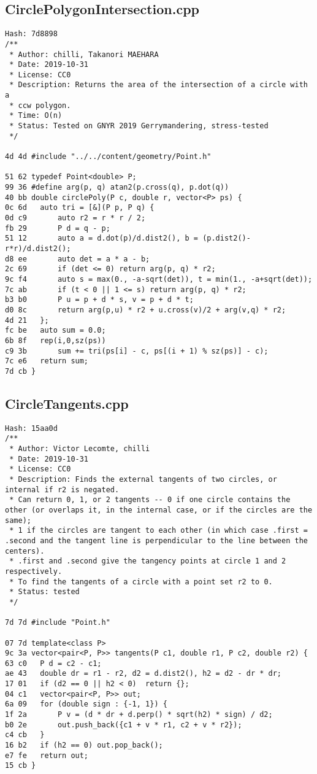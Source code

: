 \documentclass[11pt, a4paper, twoside]{article}
\begin{document}
\subsection{CirclePolygonIntersection.cpp}
\begin{lstlisting}
Hash: 7d8898
/**
 * Author: chilli, Takanori MAEHARA
 * Date: 2019-10-31
 * License: CC0
 * Description: Returns the area of the intersection of a circle with a
 * ccw polygon.
 * Time: O(n)
 * Status: Tested on GNYR 2019 Gerrymandering, stress-tested
 */

4d 4d #include "../../content/geometry/Point.h"

51 62 typedef Point<double> P;
99 36 #define arg(p, q) atan2(p.cross(q), p.dot(q))
40 bb double circlePoly(P c, double r, vector<P> ps) {
0c 6d 	auto tri = [&](P p, P q) {
0d c9 		auto r2 = r * r / 2;
fb 29 		P d = q - p;
51 12 		auto a = d.dot(p)/d.dist2(), b = (p.dist2()-r*r)/d.dist2();
d8 ee 		auto det = a * a - b;
2c 69 		if (det <= 0) return arg(p, q) * r2;
9c f4 		auto s = max(0., -a-sqrt(det)), t = min(1., -a+sqrt(det));
7c ab 		if (t < 0 || 1 <= s) return arg(p, q) * r2;
b3 b0 		P u = p + d * s, v = p + d * t;
d0 8c 		return arg(p,u) * r2 + u.cross(v)/2 + arg(v,q) * r2;
4d 21 	};
fc be 	auto sum = 0.0;
6b 8f 	rep(i,0,sz(ps))
c9 3b 		sum += tri(ps[i] - c, ps[(i + 1) % sz(ps)] - c);
7c e6 	return sum;
7d cb }
\end{lstlisting}

\subsection{CircleTangents.cpp}
\begin{lstlisting}
Hash: 15aa0d
/**
 * Author: Victor Lecomte, chilli
 * Date: 2019-10-31
 * License: CC0
 * Description: Finds the external tangents of two circles, or internal if r2 is negated.
 * Can return 0, 1, or 2 tangents -- 0 if one circle contains the other (or overlaps it, in the internal case, or if the circles are the same);
 * 1 if the circles are tangent to each other (in which case .first = .second and the tangent line is perpendicular to the line between the centers).
 * .first and .second give the tangency points at circle 1 and 2 respectively.
 * To find the tangents of a circle with a point set r2 to 0.
 * Status: tested
 */

7d 7d #include "Point.h"

07 7d template<class P>
9c 3a vector<pair<P, P>> tangents(P c1, double r1, P c2, double r2) {
63 c0 	P d = c2 - c1;
ae 43 	double dr = r1 - r2, d2 = d.dist2(), h2 = d2 - dr * dr;
17 01 	if (d2 == 0 || h2 < 0)  return {};
04 c1 	vector<pair<P, P>> out;
6a 09 	for (double sign : {-1, 1}) {
1f 2a 		P v = (d * dr + d.perp() * sqrt(h2) * sign) / d2;
b0 2e 		out.push_back({c1 + v * r1, c2 + v * r2});
c4 cb 	}
16 b2 	if (h2 == 0) out.pop_back();
e7 fe 	return out;
15 cb }
\end{lstlisting}
\end{document}
